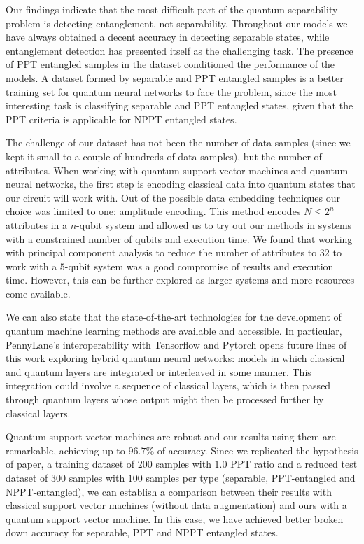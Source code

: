 Our findings indicate that the most difficult part of the quantum separability problem is detecting entanglement, not separability. Throughout our models we have always obtained a decent accuracy in detecting separable states, while entanglement detection has presented itself as the challenging task. The presence of PPT entangled samples in the dataset conditioned the performance of the models. A dataset formed by separable and PPT entangled samples is a better training set for quantum neural networks to face the problem, since the most interesting task is classifying separable and PPT entangled states, given that the PPT criteria is applicable for NPPT entangled states. 

The challenge of our dataset has not been the number of data samples (since we kept it small to a couple of hundreds of data samples), but the number of attributes. When working with quantum support vector machines and quantum neural networks, the first step is encoding classical data into quantum states that our circuit will work with. Out of the possible data embedding techniques our choice was limited to one: amplitude encoding. This method encodes $N \leq 2^n$ attributes in a $n$-qubit system and allowed us to try out our methods in systems with a constrained number of qubits and execution time. We found that working with principal component analysis to reduce the number of attributes to $32$ to work with a $5$-qubit system was a good compromise of results and execution time. However, this can be further explored as larger systems and more resources come available.

We can also state that the state-of-the-art technologies for the development of quantum machine learning methods are available and accessible. In particular, PennyLane's interoperability with Tensorflow and Pytorch opens future lines of this work exploring hybrid quantum neural networks: models in which classical and quantum layers are integrated or interleaved in some manner. This integration could involve a sequence of classical layers, which is then passed through quantum layers whose output might then be processed further by classical layers. 

Quantum support vector machines are robust and our results using them are remarkable, achieving up to $96.7\%$ of accuracy. Since we replicated the hypothesis of \cite{casale2023large} paper, a training dataset of $200$ samples with $1.0$ PPT ratio and a reduced test dataset of $300$ samples with $100$ samples per type (separable, PPT-entangled and NPPT-entangled), we can establish a comparison between their results with classical support vector machines (without data augmentation) and ours with a quantum support vector machine. In this case, we have achieved better broken down accuracy for separable, PPT and NPPT entangled states. 


